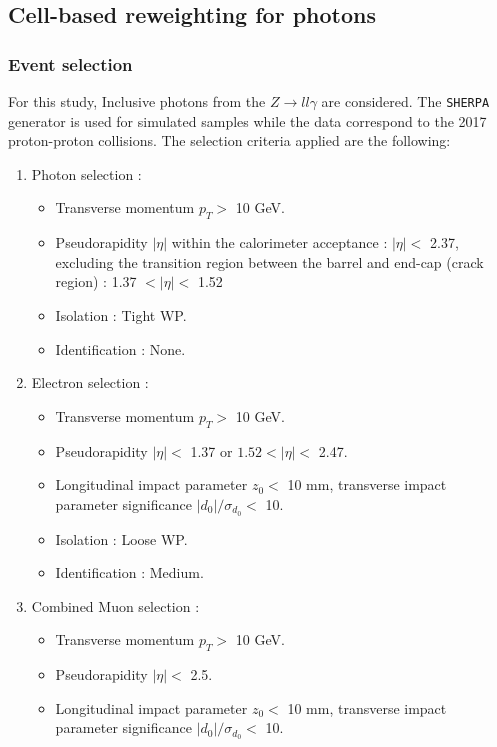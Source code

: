 \subsection{Cell-based reweighting for photons}
\label{gamma:ss:reweighting:photon}

\subsubsection{Event selection}
\label{gamma:ss:reweighting:photon:RadZSel}
For this study, Inclusive photons from the $Z\rightarrow ll\gamma$ are considered. The \verb|SHERPA| generator is used for simulated samples while the data correspond to the 2017 proton-proton collisions. The selection criteria applied are the following:
\begin{enumerate}
    \item Photon selection :  
    \begin{itemize}
    \item Transverse momentum $p_T > $  10 GeV.
    \item Pseudorapidity $|\eta|$ within the calorimeter acceptance : $|\eta| < $ 2.37, excluding the transition region between the barrel and end-cap (crack region) : 1.37 $ < |\eta| < $ 1.52
    \item Isolation : Tight WP.
    \item Identification : None. 
\end{itemize}
    \item Electron selection :
    \begin{itemize}
        \item Transverse momentum $p_T > $ 10 GeV.
        \item Pseudorapidity $|\eta| < $ 1.37 or $1.52 < |\eta| < $ 2.47.
        \item Longitudinal impact parameter $z_0 < $ 10 mm, transverse impact parameter significance $|d_0|/\sigma_{d_0} < $ 10.
        \item Isolation : Loose WP.
        \item Identification : Medium.
    \end{itemize}
    \item Combined Muon selection : 
    \begin{itemize}
        \item Transverse momentum $p_T > $ 10 GeV.
        \item Pseudorapidity $|\eta| < $ 2.5.
        \item Longitudinal impact parameter $z_0 < $ 10 mm, transverse impact parameter significance $|d_0|/\sigma_{d_0} < $ 10.

\end{itemize}
\end{enumerate}
